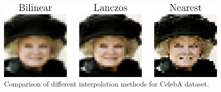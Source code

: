 {%
\begin{figure}[t]
    \centering
    \includegraphics[scale=0.5]{graphics/paper_modelagnostic/celeba_difference_correct_font.pdf}
    \caption{Comparison of different interpolation methods for CelebA dataset.}
    \label{fig_modelagnostic:celeba}
     \vspace*{-\baselineskip}
\end{figure}

}

